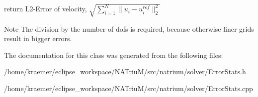 return L2-\/\-Error of velocity, $ \sqrt{ \sum_{i=1}^{N} \|u_{i} - u_{i}^{ref}\|_{2}^{2} } $ 

\begin{DoxyNote}{Note}
The division by the number of dofs is required, because otherwise finer grids result in bigger errors. 
\end{DoxyNote}


The documentation for this class was generated from the following files\-:\begin{DoxyCompactItemize}
\item 
/home/kraemer/eclipse\-\_\-workspace/\-N\-A\-Triu\-M/src/natrium/solver/Error\-Stats.\-h\item 
/home/kraemer/eclipse\-\_\-workspace/\-N\-A\-Triu\-M/src/natrium/solver/Error\-Stats.\-cpp\end{DoxyCompactItemize}
